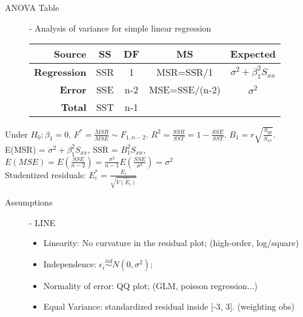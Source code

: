 \documentclass[10pt,landscape]{article}
\begin{document}
\begin{multicols}{3}
    \begin{description}
    \item[ANOVA Table] - Analysis of variance for simple linear regression \\
        \begin{center}
            \begin{tabular}{r|cccc}
                \textbf{Source}  & \textbf{SS} & \textbf{DF} & \textbf{MS} &\textbf{ Expected}  \\ \hline
                \textbf{Regression} & SSR & 1 & MSR=SSR/1 & $\sigma^2 + \beta_1^2S_{xx}$\\
                \textbf{Error} & SSE & n-2 & MSE=SSE/(n-2) & $\sigma^2$ \\
                \textbf{Total} & SST &  n-1 &\  & \  \\
            \end{tabular}
        \end{center}
\end{description}
    Under $H_0: \beta_1=0$, $F^* = \frac{MSR}{MSE}\sim F_{1,n-2}$. $R^2 = \frac{SSR}{SST} = 1-\frac{SSE}{SST}$. $B_1 = r\sqrt{\frac{S_{yy}}{S_{xx}}}$. \\
    E(MSR) = $\sigma^2 + \beta_1^2S_{xx}$, SSR = $B_1^2S_{xx}$, $E(MSE) = E(\frac{SSE}{n-2}) = \frac{\sigma^2}{n-1}E(\frac{SSE}{\sigma^2}) = \sigma^2$\\
    Studentized residuals: $E_i^* = \frac{E_i}{\sqrt{\hat{V(E_i)}}}$ 
    
    \begin{description}
    \item[Assumptions]  - LINE
    \begin{itemize}
    		\item Linearity: No curvature in the residual plot; (high-order, log/square)
    		\item Independence: $\epsilon_i \overset{iid}{\sim} N(0, \sigma^2)$;
    		\item Normality of error: QQ plot; (GLM, poisson regression...)
    		\item Equal Variance: standardized residual inside [-3, 3]. (weighting obs)
    \end{itemize}
    \end{description}


    

\end{multicols}
\end{document}
